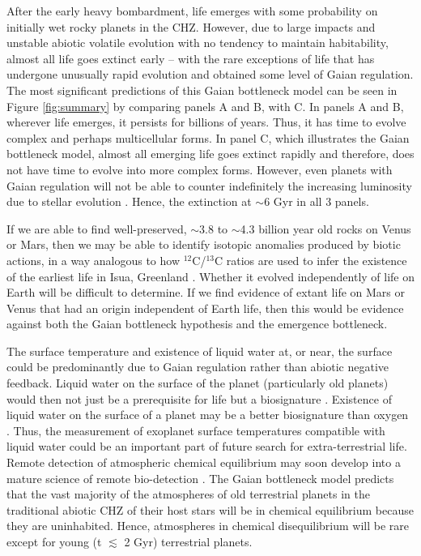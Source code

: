 After the early heavy bombardment, life emerges with some probability on initially wet rocky planets in the CHZ.
However, due to large impacts and unstable abiotic volatile evolution with no
tendency to maintain habitability, almost all life goes extinct early -- with the rare exceptions of life
that has undergone unusually rapid evolution and obtained some level of Gaian regulation. The most significant predictions of this Gaian bottleneck model can be seen in Figure \ref{fig:summary} by comparing panels A and B, with C.
In panels A and B, wherever life emerges, it persists for billions of years. Thus, it has time to evolve complex and perhaps multicellular forms. In panel C, which illustrates the Gaian bottleneck model, almost all emerging life goes extinct rapidly and therefore, does not have time to evolve into more complex forms.
However, even planets with Gaian regulation will not be able to counter indefinitely the increasing luminosity due to stellar evolution  \citep{Caldeira1992,Franck2000,Lenton2001,Franck2002,vonBloh2005}. Hence, the extinction at $\sim$6 Gyr in all 3 panels.

If we are able to find well-preserved, $\sim$3.8 to $\sim$4.3 billion year old rocks on Venus or Mars, then we may be able to identify
isotopic anomalies produced by biotic actions, in a way analogous to how $^{12}$C/$^{13}$C ratios are used to infer the existence of the earliest life in Isua, Greenland \citep{Ohtomo2014}. Whether it evolved independently of life on Earth will be difficult to determine. If we find evidence of extant life on Mars or Venus that had an origin independent of Earth life, then this would be evidence against both the Gaian bottleneck hypothesis and the emergence bottleneck.

The surface temperature and existence of liquid water at, or near, the surface could be predominantly due to Gaian regulation rather than abiotic negative  feedback. Liquid water on the surface of the planet (particularly old planets) would then not just be a prerequisite for life but a biosignature \citep{Gorshkov2004}. Existence of liquid water on the surface of a planet may be a better biosignature than oxygen \citep{Luger2015}. Thus, the measurement of exoplanet surface temperatures compatible with liquid water could be an important part of future search for extra-terrestrial life. Remote detection of atmospheric chemical equilibrium may soon develop into a mature science of remote bio-detection \citep[\eg,][]{Lovelock1975,Krissansen-Totton2016}. The Gaian bottleneck model predicts that the vast majority of the atmospheres of old terrestrial planets in the traditional abiotic CHZ of their host stars will be in chemical equilibrium because they are uninhabited. Hence, atmospheres in chemical disequilibrium will be rare except for young (t $\lesssim$ 2 Gyr) terrestrial planets.

